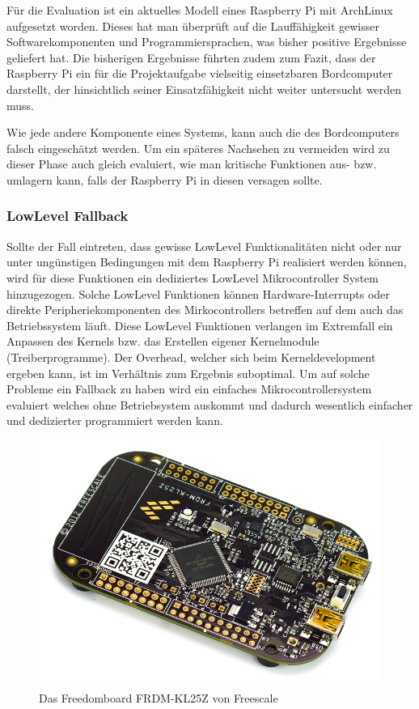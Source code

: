 Für die Evaluation ist ein aktuelles Modell eines Raspberry Pi mit
ArchLinux aufgesetzt worden. Dieses hat man überprüft auf die 
Lauffähigkeit gewisser Softwarekomponenten und Programmiersprachen,
was bisher positive Ergebnisse geliefert hat. Die bisherigen Ergebnisse
führten zudem zum Fazit, dass der Raspberry Pi ein für die Projektaufgabe
vielseitig einsetzbaren Bordcomputer darstellt, der hinsichtlich seiner
Einsatzfähigkeit nicht weiter untersucht werden muss.

Wie jede andere Komponente eines Systems, kann auch die des Bordcomputers
falsch eingeschätzt werden. Um ein späteres Nachsehen zu vermeiden wird
zu dieser Phase auch gleich evaluiert, wie man kritische Funktionen
aus- bzw. umlagern kann, falls der Raspberry Pi in diesen versagen sollte.

\subsubsection{LowLevel Fallback}
\label{ssc_lowlevel_fallback}
Sollte der Fall eintreten, dass gewisse LowLevel Funktionalitäten nicht
oder nur unter ungünstigen Bedingungen mit dem Raspberry Pi realisiert 
werden können, wird für diese Funktionen ein dediziertes LowLevel 
Mikrocontroller System hinzugezogen. Solche LowLevel Funktionen können
Hardware-Interrupts oder direkte Peripheriekomponenten des Mirkocontrollers
betreffen auf dem auch das Betriebssystem läuft. Diese LowLevel Funktionen
verlangen im Extremfall ein Anpassen des Kernels bzw. das Erstellen eigener
Kernelmodule (Treiberprogramme). Der Overhead, welcher sich beim 
Kerneldevelopment ergeben kann, ist im Verhältnis zum Ergebnis suboptimal. 
Um auf solche Probleme ein Fallback zu haben wird ein einfaches 
Mikrocontrollersystem evaluiert welches ohne Betriebsystem auskommt und
dadurch wesentlich einfacher und dedizierter programmiert werden kann.

\begin{figure}[h!]
	\centering
	\includegraphics[scale=1]{../../fig/frdm-kl25z.jpg}
	\caption{Das Freedomboard FRDM-KL25Z von Freescale}
\end{figure}

